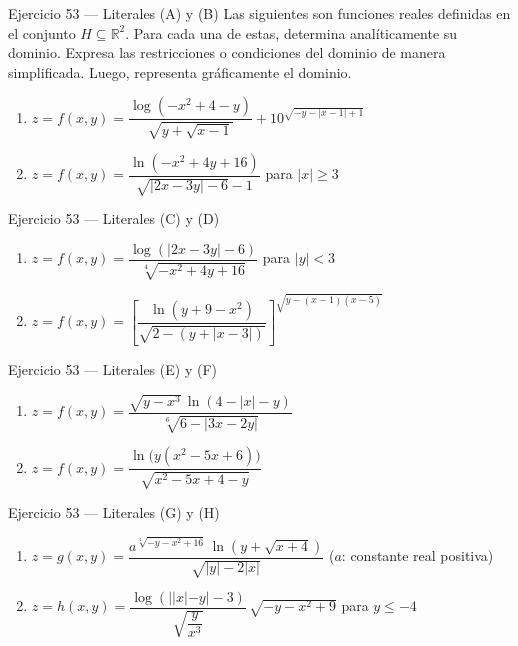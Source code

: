 \documentclass[aspectratio=169,10pt]{beamer}
\begin{document}
\begin{frame}{Ejercicio 53 — Literales (A) y (B)}
  \small
  Las siguientes son funciones reales definidas en el conjunto $H \subseteq \mathbb{R}^2$. Para cada una de estas, determina analíticamente su dominio. Expresa las restricciones o condiciones del dominio de manera simplificada. Luego, representa gráficamente el dominio.

  \medskip
  \begin{enumerate}
    \item[(A)] $z = f(x,y) = \dfrac{\log(-x^2 + 4 - y)}{\sqrt{y + \sqrt{x-1}}} + 10^{\sqrt{-y - |x-1| + 1}}$
    \vspace{2.2cm}
    \item[(B)] $z = f(x,y) = \dfrac{\ln(-x^2 + 4y + 16)}{\sqrt{|2x - 3y| - 6} - 1}$ \quad para $|x| \ge 3$
  \end{enumerate}
  \vfill
\end{frame}

\begin{frame}{Ejercicio 53 — Literales (C) y (D)}
  \small
  \begin{enumerate}
    \item[(C)] $z = f(x,y) = \dfrac{\log(|2x - 3y| - 6)}{\sqrt[4]{-x^2 + 4y + 16}}$ \quad para $|y| < 3$
    \vspace{2.6cm}
    \item[(D)] $z = f(x,y) = \left[\dfrac{\ln(y + 9 - x^2)}{\sqrt{2 - (y + |x-3|)}}\right]^{\sqrt{y - (x-1)(x-5)}}$
  \end{enumerate}
  \vfill
\end{frame}

\begin{frame}{Ejercicio 53 — Literales (E) y (F)}
  \small
  \begin{enumerate}
    \item[(E)] $z = f(x,y) = \dfrac{\sqrt{y - x^3}\,\ln(4 - |x| - y)}{\sqrt[6]{6 - |3x - 2y|}}$
    \vspace{2.6cm}
    \item[(F)] $z = f(x,y) = \dfrac{\ln\big(y(x^2 - 5x + 6)\big)}{\sqrt{x^2 - 5x + 4 - y}}$
  \end{enumerate}
  \vfill
\end{frame}

\begin{frame}{Ejercicio 53 — Literales (G) y (H)}
  \small
  \begin{enumerate}
    \item[(G)] $z = g(x,y) = \dfrac{a^{\sqrt[4]{-y - x^2 + 16}}\,\ln(y + \sqrt{x+4})}{\sqrt{|y| - 2|x|}}$ \quad ($a$: constante real positiva)
    \vspace{2.6cm}
    \item[(H)] $z = h(x,y) = \dfrac{\log(||x| - y| - 3)}{\sqrt{\dfrac{y}{x^3}}}\,\sqrt{-y - x^2 + 9}$ \quad para $y \le -4$
  \end{enumerate}
  \vfill
\end{frame}
\end{document}
